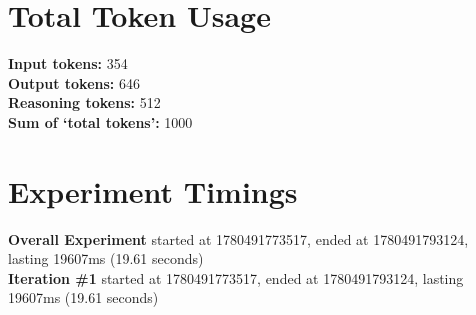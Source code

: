 \documentclass{article}
\begin{document}
\section*{Total Token Usage}
\textbf{Input tokens: }354
\\\textbf{Output tokens: }646
\\\textbf{Reasoning tokens: }512
\\\textbf{Sum of `total tokens': }1000
\section*{Experiment Timings}
\textbf{Overall Experiment} started at 1780491773517, ended at 1780491793124, lasting 19607ms (19.61 seconds)
\\\textbf{Iteration \#1} started at 1780491773517, ended at 1780491793124, lasting 19607ms (19.61 seconds)
\end{document}
